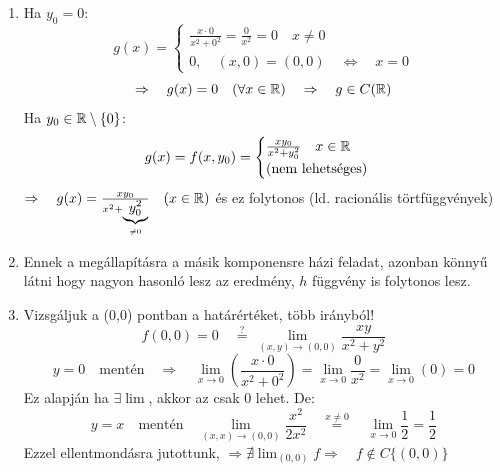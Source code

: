 \documentclass[a4paper,11.5pt]{article}
\begin{document}
\begin{example}
		\begin{enumerate}
			\item Ha $y_0=0$:
			\[ g(x)=\begin{cases}
				\frac{x\cdot0}{x^2+0^2}=\frac{0}{x^2}=0\quad x\not=0\\
				0,\quad (x,0)=(0,0)\quad \Leftrightarrow\quad x=0
			\end{cases} \]
			\[ \Rightarrow\quad g(x)=0\quad (\forall x\in\mathbb{R}) \quad \Rightarrow\quad g\in C(\mathbb{R}) \]
			Ha $y_0\in\mathbb{R}\setminus\{ 0 \}$:
			\[ g(x)=f(x,y_0)=\begin{cases}
			\frac{xy_0}{ x^2+y_0^2 }\quad x\in\mathbb{R}\\
			\text{(nem lehetséges)}
			\end{cases}\]
			$\Rightarrow\quad g(x)=\frac{xy_0}{x^2+\underbrace{y_0^2}_{\not=0}}\quad (x\in\mathbb{R})$ és ez folytonos (ld. racionális törtfüggvények)
			\item Ennek a megállapításra a másik komponensre házi feladat, azonban könnyű látni hogy nagyon hasonló lesz az eredmény, $h$ függvény is folytonos lesz.
			\item Vizsgáljuk a (0,0) pontban a határértéket, több irányból!
			\[ f(0,0)=0\quad \overset{?}{=}\ \lim_{(x,y)\to(0,0)}\frac{xy}{x^2+y^2} \]
			\[ y=0\quad \text{mentén}\quad \Rightarrow\quad \lim_{x\to0}\left(\frac{x\cdot0}{x^2+0^2}\right)=\lim_{x\to0}\frac{0}{x^2}=\lim_{x\to0}(0)=0 \]
			Ez alapján ha $\exists\lim$, akkor az csak 0 lehet. De:
			\[ y=x\quad \text{mentén}\quad \lim_{(x,x)\to(0,0)}\frac{x^2}{2x^2}\quad\overset{x\not=0}{=} \quad \lim_{x\to0}\frac{1}{2}=\frac{1}{2} \]
			Ezzel ellentmondásra jutottunk, $\Rightarrow\nexists\lim_{(0,0)}f\Rightarrow\quad f\notin C\{ (0,0) \}$ 
		\end{enumerate}
	\end{example}
\end{document}

